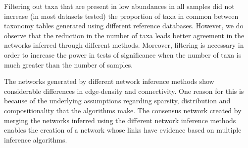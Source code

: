 
Filtering out taxa that are present in low abundances in all samples did not increase (in most datasets tested) the proportion of taxa in common between taxonomy tables generated using different reference databases.
However, we do observe that the reduction in the number of taxa leads better agreement in the networks inferred through different methods.
Moreover, filtering is necessary in order to increase the power in tests of significance when the number of taxa is much greater than the number of samples.

The networks generated by different network inference methods show considerable differences in edge-density and connectivity.
One reason for this is because of the underlying assumptions regarding sparsity, distribution and compositionality that the algorithms make.
The consensus network created by merging the networks inferred using the different network inference methods enables the creation of a network whose links have evidence based on multiple inference algorithms.

